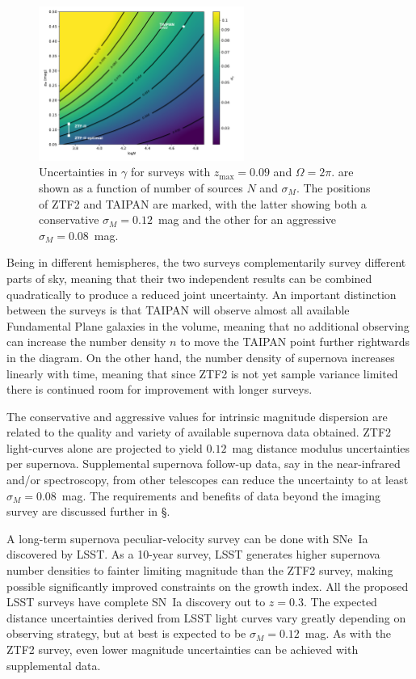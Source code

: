 \documentclass[11pt, oneside]{article}   	%
\begin{document}
\begin{figure}
\centering
\includegraphics[width=0.6\textwidth]{src/surface1.pdf}
\caption{Uncertainties in $\gamma$ for surveys  with $z_{\text{max}}=0.09$ and $\Omega = 2\pi$.
are shown as a function of number of sources $N$ and $\sigma_M$.  The positions of ZTF2 and TAIPAN are marked,
with the latter showing both  a conservative $\sigma_M=0.12$~mag and the other for an aggressive $\sigma_M=0.08$~mag.
\label{surface:fig}}
\end{figure}

Being in different hemispheres, the two surveys
complementarily survey different parts of sky, meaning that their two independent results can be
combined  quadratically to produce a reduced joint uncertainty.  An important distinction between the surveys is
that TAIPAN will observe almost all available Fundamental Plane galaxies in the volume, meaning that no additional observing can
increase the number density $n$ to
move the TAIPAN point further rightwards in the diagram.  On the other hand, the number density of supernova increases
linearly with time, meaning that since ZTF2 is not yet sample variance limited there is continued room for improvement with longer surveys.


The conservative and aggressive values for intrinsic magnitude dispersion are related to the quality and variety of available supernova
data
obtained.  ZTF2 light-curves alone are projected to yield $0.12$~mag distance modulus uncertainties per supernova.
Supplemental supernova follow-up data, say in the near-infrared and/or
spectroscopy, from other telescopes can reduce the uncertainty to at least $\sigma_M=0.08$~mag.  The requirements
and benefits of data beyond the imaging survey are discussed further in \S.

A long-term supernova peculiar-velocity survey can be done with SNe~Ia discovered by LSST.
As a 10-year survey, LSST generates higher supernova number densities to fainter limiting magnitude than the ZTF2 survey,
making possible significantly improved constraints on the growth index.
All the proposed LSST surveys have complete SN~Ia discovery out to $z=0.3$.
The expected distance uncertainties derived from LSST light curves vary greatly depending on observing strategy, but at best
is expected to be $\sigma_M=0.12$~mag.    As with the ZTF2 survey, even lower magnitude uncertainties
can be achieved with supplemental data.
\end{document}
